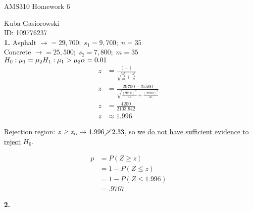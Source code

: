 \documentclass[12pt]{report}
\makeatletter
\newcommand*{\Xbar}{}%
\DeclareRobustCommand*{\Xbar}{%
	\mathpalette\@Xbar{}%
}
\newcommand*{\@Xbar}[2]{%
	\sbox0{$#1\mathrm{X}\m@th$}%
	\sbox2{$#1X\m@th$}%
	\rlap{%
		\hbox to\wd2{%
			\hfill
			$\overline{%
				\vrule width 0pt height\ht0 %
				\kern\wd0 %
			}$%
		}%
	}%
	\copy2 %
}
\newcommand*{\xbar}{}%
\DeclareRobustCommand*{\xbar}{%
	\mathpalette\@xbar{}%
}
\newcommand*{\@xbar}[2]{%
	\sbox0{$#1\mathrm{x}\m@th$}%
	\sbox2{$#1x\m@th$}%
	\rlap{%
		\hbox to\wd2{%
			\hfill
			$\overline{%
				\vrule width 0pt height\ht0 %
				\kern\wd0 %
			}$%
		}%
	}%
	\copy2 %
}
\newcommand*{\Ybar}{}%
\DeclareRobustCommand*{\Ybar}{%
	\mathpalette\@Ybar{}%
}
\newcommand*{\@Ybar}[2]{%
	\sbox0{$#1\mathrm{Y}\m@th$}%
	\sbox2{$#1Y\m@th$}%
	\rlap{%
		\hbox to\wd2{%
			\hfill
			$\overline{%
				\vrule width 0pt height\ht0 %
				\kern\wd0 %
			}$%
		}%
	}%
	\copy2 %
}
\newcommand*{\ybar}{}%
\DeclareRobustCommand*{\ybar}{%
	\mathpalette\@ybar{}%
}
\newcommand*{\@ybar}[2]{%
	\sbox0{$#1\mathrm{y}\m@th$}%
	\sbox2{$#1y\m@th$}%
	\rlap{%
		\hbox to\wd2{%
			\hfill
			$\overline{%
				\vrule width 0pt height\ht0 %
				\kern\wd0 %
			}$%
		}%
	}%
	\copy2 %
}
\makeatother
\begin{document}
\Large
\centering
AMS310 Homework 6

\justify
\normalsize

Kuba Gasiorowski\\
ID: 109776237\\

\noindent \textbf{1.} Asphalt $ \rightarrow \Xbar = 29,700;\;s_1 = 9,700;\;n=35$\\
Concrete $ \rightarrow \Ybar = 25,500;\;s_2 = 7,800;\;m=35$\\

\noindent $H_0: \mu_1 = \mu_2\\
H_1: \mu_1 > \mu_2\\\\
\alpha = 0.01$
\begin{align*}
	z &= \frac{(\xbar - \ybar)}{\sqrt{\frac{s_1^2}{m} + \frac{s_2^2}{n}}}\\
	z &= \frac{29700 - 25500}{\sqrt{\frac{(9700)^2}{35} + \frac{(7800)^2}{35}}}\\
	z &= \frac{4200}{2103.942}\\
	z &\approx 1.996
\end{align*}

\noindent Rejection region: $z \geq z_\alpha \rightarrow 1.996 \,\cancel{\geq}\, 2.33$, so \underline{we do not have sufficient evidence to reject} $H_0$.

\begin{align*}
	p &= P(Z \geq z)\\
	&= 1 - P(Z \leq z)\\
	&= 1 - P(Z \leq 1.996)\\
	&= \boxed{.9767}
\end{align*}

\noindent \textbf{2.}
\end{document}
